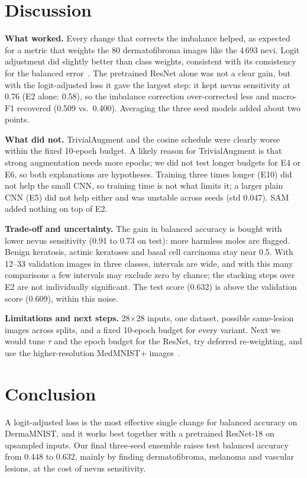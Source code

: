 \documentclass[conference]{IEEEtran}
\begin{document}
\section{Discussion}
\textbf{What worked.} Every change that corrects the imbalance helped, as expected for a metric that weights
the 80 dermatofibroma images like the 4\,693 nevi. Logit adjustment did slightly better than class weights,
consistent with its consistency for the balanced error~\cite{menon2021logit}. The pretrained ResNet alone was
not a clear gain, but with the logit-adjusted loss it gave the largest step: it kept nevus sensitivity at
0.76 (E2 alone: 0.58), so the imbalance correction over-corrected less and macro-F1 recovered (0.509 vs.\
0.400). Averaging the three seed models added about two points.

\textbf{What did not.} TrivialAugment and the cosine schedule were clearly worse within the fixed 10-epoch
budget. A likely reason for TrivialAugment is that strong augmentation needs more epochs; we did not test longer
budgets for E4 or E6, so both explanations are hypotheses. Training three times longer (E10) did not help the
small CNN, so training time is not what limits it; a larger plain CNN (E5) did not help either and was unstable
across seeds (std 0.047). SAM added nothing on top of E2.

\textbf{Trade-off and uncertainty.} The gain in balanced accuracy is bought with lower nevus sensitivity
(0.91 to 0.73 on test): more harmless moles are flagged. Benign keratosis, actinic keratoses and basal cell
carcinoma stay near 0.5. With 12--33 validation images in three classes, intervals are wide, and with this
many comparisons a few intervals may exclude zero by chance; the stacking steps over E2 are not individually
significant. The test score (0.632) is above the validation score (0.609), within this noise.

\textbf{Limitations and next steps.} 28$\times$28 inputs, one dataset, possible same-lesion images across
splits, and a fixed 10-epoch budget for every variant. Next we would tune $\tau$ and the epoch budget for the
ResNet, try deferred re-weighting, and use the higher-resolution MedMNIST+ images~\cite{doerrich2025medmnistplus}.

\section{Conclusion}
A logit-adjusted loss is the most effective single change for balanced accuracy on DermaMNIST, and it works
best together with a pretrained ResNet-18 on upsampled inputs. Our final three-seed ensemble raises test
balanced accuracy from 0.448 to 0.632, mainly by finding dermatofibroma, melanoma and vascular lesions, at
the cost of nevus sensitivity.
\end{document}
